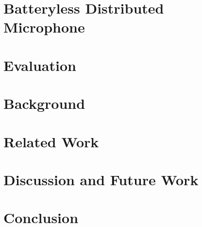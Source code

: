 \documentclass[sigconf]{acmart}
\begin{document}
\section{Batteryless Distributed Microphone}
\label{sec:disMic}


\section{Evaluation}
\label{sec:evaluation}


\section{Background}
\label{sec:background}


\section{Related Work}
\label{sec:relatedWork}


\section{Discussion and Future Work}
\label{sec:discussion}

\section{Conclusion}

\newpage



\end{document}
